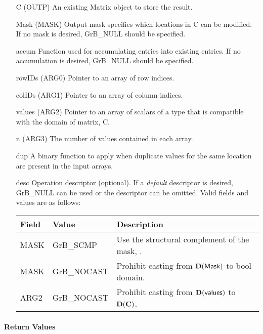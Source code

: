 \begin{itemize}[leftmargin=1.1in]
    \item[{\sf C}]      ({\sf OUTP}) An existing Matrix object to store the result.
    \item[{\sf Mask}]   ({\sf MASK}) Output mask specifies which locations in
                        {\sf C} can be modified.  If no mask is desired,
	                    {\sf GrB\_NULL} should be specified.
	\item[{\sf accum}]  Function used for accumulating entries into existing
                         entries. If no accumulation is desired,
	                    {\sf GrB\_NULL} should be specified.
	\item[{\sf rowIDs}] ({\sf ARG0}) Pointer to an array of row indices. 
	\item[{\sf colIDs}] ({\sf ARG1}) Pointer to an array of column indices. 
	\item[{\sf values}] ({\sf ARG2}) Pointer to an array of scalars of a type that
                                     is compatible with the domain of matrix, {\sf C}.
    \item[{\sf n}]      ({\sf ARG3}) The number of values contained in each array.
    \item[{\sf dup}]    A binary function to apply when duplicate values for
                        the same location are present in the input arrays.
                                     
    \item[{\sf desc}]   Operation descriptor (optional). If a
	\emph{default} descriptor is desired, {\sf GrB\_NULL} can be
	used or the descriptor can be omitted.  Valid fields and values are as follows: \\
    \begin{tabular}{lll}
    Field  & Value & Description \\
    \hline
    {\sf MASK} & {\sf GrB\_SCMP}   & Use the structural complement of the mask, . \\
    {\sf MASK} & {\sf GrB\_NOCAST} & Prohibit casting from $\bold{D}({\sf Mask})$ to {\sf bool} domain. \\
    {\sf ARG2} & {\sf GrB\_NOCAST} & Prohibit casting from $\bold{D}({\sf values})$ to $\bold{D}({\bf C})$. \\
    \end{tabular}
\end{itemize}

\paragraph{Return Values}

